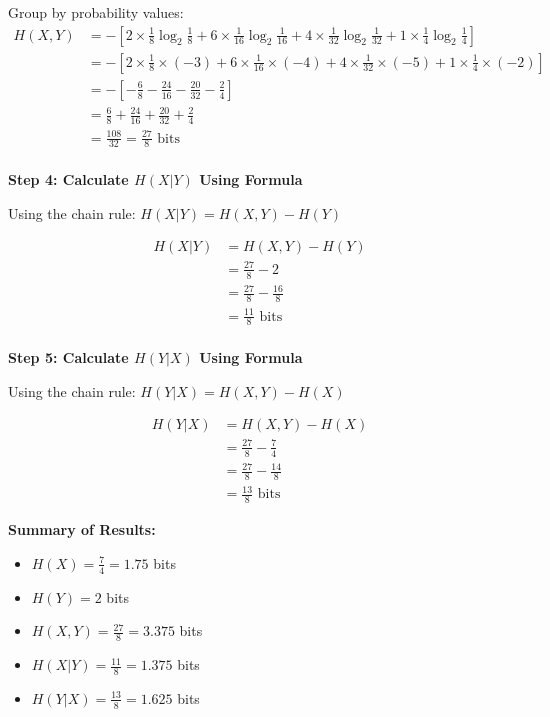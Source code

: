 \documentclass[11pt,a4paper]{book}
\newcounter{qna}[chapter]
\renewcommand{\theqna}{\thechapter.\arabic{qna}}
\newenvironment{questionanswerbox}{
    \refstepcounter{qna}%
    \begin{tcolorbox}[
        enhanced,
        breakable,
        colback=softlavender!10,
        colframe=softlavender!200,
        title={Example~\theqna}, %
        fonttitle=\bfseries,
        coltitle=white,
        colbacktitle=softlavender!200,
        sharp corners,
        boxrule=1pt,
        left=8pt,
        right=8pt,
        top=6pt,
        bottom=6pt
    ]
}{
    \end{tcolorbox}
}
\begin{document}
\begin{questionanswerbox}
    Group by probability values:
    \begin{align*}
        H(X,Y) & = -\left[2 \times \frac{1}{8}\log_2\frac{1}{8} + 6 \times \frac{1}{16}\log_2\frac{1}{16} + 4 \times \frac{1}{32}\log_2\frac{1}{32} + 1 \times \frac{1}{4}\log_2\frac{1}{4}\right] \\
               & = -\left[2 \times \frac{1}{8} \times (-3) + 6 \times \frac{1}{16} \times (-4) + 4 \times \frac{1}{32} \times (-5) + 1 \times \frac{1}{4} \times (-2)\right]                       \\
               & = -\left[-\frac{6}{8} - \frac{24}{16} - \frac{20}{32} - \frac{2}{4}\right]                                                                                                        \\
               & = \frac{6}{8} + \frac{24}{16} + \frac{20}{32} + \frac{2}{4}                                                                                                                       \\
               & = \frac{108}{32} = \frac{27}{8} \text{ bits}
    \end{align*}
    \\
    \textbf{Step 4: Calculate \(H(X|Y)\) Using Formula}

    Using the chain rule: \(H(X|Y) = H(X,Y) - H(Y)\)

    \begin{align*}
        H(X|Y) & = H(X,Y) - H(Y)               \\
               & = \frac{27}{8} - 2            \\
               & = \frac{27}{8} - \frac{16}{8} \\
               & = \frac{11}{8} \text{ bits}
    \end{align*}
    \\
    \textbf{Step 5: Calculate \(H(Y|X)\) Using Formula}

    Using the chain rule: \(H(Y|X) = H(X,Y) - H(X)\)

    \begin{align*}
        H(Y|X) & = H(X,Y) - H(X)               \\
               & = \frac{27}{8} - \frac{7}{4}  \\
               & = \frac{27}{8} - \frac{14}{8} \\
               & = \frac{13}{8} \text{ bits}
    \end{align*}

    \textbf{Summary of Results:}
    \begin{itemize}
        \item \(H(X) = \frac{7}{4} = 1.75\) bits
        \item \(H(Y) = 2\) bits
        \item \(H(X,Y) = \frac{27}{8} = 3.375\) bits
        \item \(H(X|Y) = \frac{11}{8} = 1.375\) bits
        \item \(H(Y|X) = \frac{13}{8} = 1.625\) bits
    \end{itemize}


\end{questionanswerbox}
\end{document}
